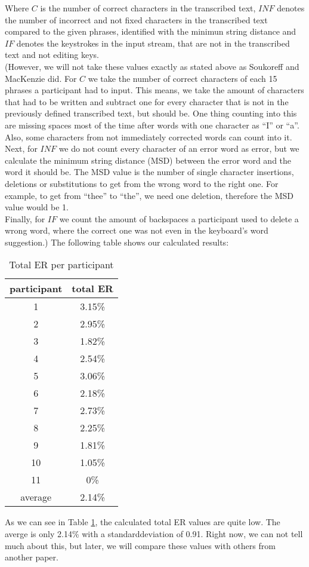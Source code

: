 Where $C$ is the number of correct characters in the transcribed text, $INF$ denotes the number of incorrect and not fixed characters in the transcribed text compared to the given phrases, identified with the minimun string distance and $IF$ denotes the keystrokes in the input stream, that are not in the transcribed text and not editing keys.\\
(However, we will not take these values exactly as stated above as Soukoreff and MacKenzie \cite{10.1145/642611.642632} did. For $C$ we take the number of correct characters of each 15 phrases a participant had to input. This means, we take the amount of characters that had to be written and subtract one for every character that is not in the previously defined transcribed text, but should be. One thing counting into this are missing spaces most of the time after words with one character as ``I'' or ``a''. Also, some characters from not immediately corrected words can count into it.\\
Next, for $INF$ we do not count every character of an error word as error, but we calculate the minimum string distance (MSD) between the error word and the word it should be. The MSD value is the number of single character insertions, deletions or substitutions to get from the wrong word to the right one. For example, to get from ``thee'' to ``the'', we need one deletion, therefore the MSD value would be 1.\\
Finally, for $IF$ we count the amount of backspaces a participant used to delete a wrong word, where the correct one was not even in the keyboard's word suggestion.) The following table shows our calculated results:
\begin{table}[H]
    \centering
    \caption{Total ER per participant}
    \begin{tabular}{cc} \toprule
        participant&total ER\\ \midrule
        1&3.15\%\\
        2&2.95\%\\
        3&1.82\%\\
        4&2.54\%\\
        5&3.06\%\\
        6&2.18\%\\
        7&2.73\%\\
        8&2.25\%\\
        9&1.81\%\\
        10&1.05\%\\
        11&0\%\\\bottomrule
        average&2.14\%\\
        \bottomrule
    \end{tabular}
    \label{tab:total_er}
\end{table}
As we can see in Table \ref{tab:total_er}, the calculated total ER values are quite low. The averge is only 2.14\% with a standarddeviation of 0.91. Right now, we can not tell much about this, but later, we will compare these values with others from another paper.\\

